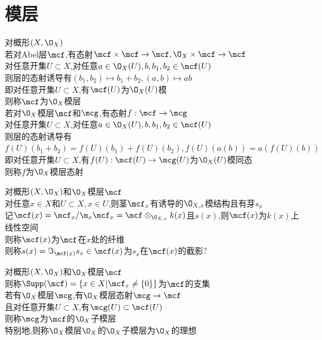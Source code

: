 \chapter{模层}

\begin{dingyi}
对概形$(X,\O_{X})$\\
若对Abel层$\mcf$,有态射$\mcf\times\mcf\to \mcf,\O_{X}\times\mcf\to\mcf$\\
对任意开集$U\subset X$,对任意$a\in \O_{X}(U),b,b_1,b_2\in \mcf(U)$\\
则层的态射诱导有$(b_1,b_2)\mapsto b_1+b_2,(a,b)\mapsto ab$\\
即对任意开集$U\subset X$,有$\mcf(U)$为$\O_{X}(U)$模\\
则称$\mcf$为$\O_{X}$模层\\
若对$\O_{X}$模层$\mcf$和$\mcg$,有态射$f:\mcf\to \mcg$\\
对任意开集$U\subset X$,对任意$a\in \O_{X}(U),b,b_1,b_2\in \mcf(U)$\\
则层的态射诱导有$f(U)(b_1+b_2)=f(U)(b_1)+f(U)(b_2),f(U)(a(b))=a(f(U)(b))$\\
即对任意开集$U\subset X$,有$f(U):\mcf(U)\to\mcg(U)$为$\O_{X}(U)$模同态\\
则称$f$为$\O_{X}$模层态射
\end{dingyi}

\begin{dingyi}
对概形$(X,\O_{X})$和$\O_{X}$模层$\mcf$\\
对任意$x\in X$和$U\subset X,x\in U$,则茎$\mcf_{x}$有诱导的$\O_{X,x}$模结构且有芽$s_{x}$\\
记$\mcf(x)=\mcf_{x}/\m_{x}\mcf_{x}=\mcf\otimes_{\O_{X,x}}k(x)$且$s(x)$,则$\mcf(x)$为$k(x)$上线性空间\\
则称$\mcf(x)$为$\mcf$在$x$处的纤维\\
则称$s(x)=\Im_{\mcf(x)}s_{x}\in \mcf(x)$为$s_{x}$在$\mcf(x)$的截影?
\end{dingyi}

\begin{dingyi}
对概形$(X,\O_{X})$和$\O_{X}$模层$\mcf$\\
则称$\Supp(\mcf)=\{x\in X|\mcf_{x}\neq\{0\}\}$为$\mcf$的支集\\
若有$\O_{X}$模层$\mcg$,有$\O_{X}$模层态射$\mcg\to\mcf$\\
且对任意开集$U\subset X$,有$\mcg(U)\subset \mcf(U)$\\
则称$\mcg$为$\mcf$的$\O_{X}$子模层\\
特别地,则称$\O_{X}$模层$\O_{X}$的$\O_{X}$子模层为$\O_{X}$的理想
\end{dingyi}

